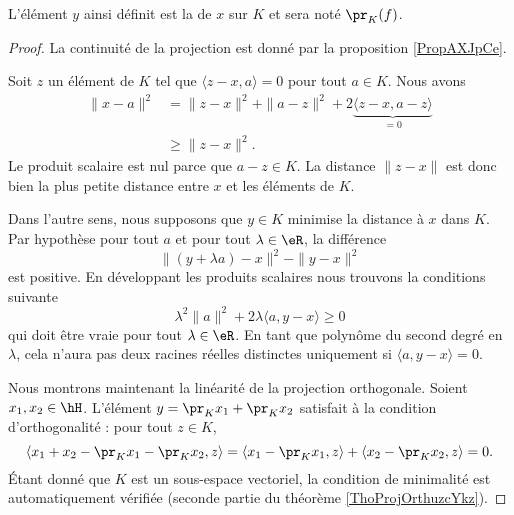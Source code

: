     L'élément \( y\) ainsi définit est la  de \( x\) sur \( K\) et sera noté \( \pr_K(f)\).

\begin{proof}

    La continuité de la projection est donné par la proposition \ref{PropAXJpCe}.

            Soit \( z\) un élément de \( K\) tel que \( \langle z-x, a\rangle =0\) pour tout \( a\in K\). Nous avons
            \begin{subequations}
                \begin{align}
                    \| x-a \|^2&=\| z-x \|^2+\| a-z \|^2+2\underbrace{\langle z-x, a-z\rangle}_{=0}\\
                    &\geq \| z-x \|^2.
                \end{align}
            \end{subequations}
            Le produit scalaire est nul parce que \( a-z\in K\). La distance \( \| z-x \|\) est donc bien la plus petite distance entre \( x\) et les éléments de \( K\).

            Dans l'autre sens, nous supposons que \( y\in K\) minimise la distance à \( x\) dans \( K\). Par hypothèse pour tout \( a\) et pour tout \( \lambda\in \eR\), la différence
            \begin{equation}
                \| (y+\lambda a)-x \|^2-\| y-x \|^2
            \end{equation}
            est positive. En développant les produits scalaires nous trouvons la conditions suivante
            \begin{equation}
                \lambda^2\| a \|^2+2\lambda\langle a, y-x\rangle \geq 0
            \end{equation}
            qui doit être vraie pour tout \( \lambda\in\eR\). En tant que polynôme du second degré en \( \lambda\), cela n'aura pas deux racines réelles distinctes uniquement si \( \langle a, y-x\rangle =0\).
    
            Nous montrons maintenant la linéarité de la projection orthogonale. Soient \( x_1,x_2\in\hH\). L'élément \( y=\pr_Kx_1+\pr_Kx_2\) satisfait à la condition d'orthogonalité : pour tout \( z\in K\),
    \begin{equation}
        \langle x_1+x_2-\pr_Kx_1-\pr_Kx_2, z\rangle =\langle x_1-\pr_Kx_1, z\rangle +\langle x_2-\pr_Kx_2, z\rangle =0.
    \end{equation}
    Étant donné que \( K\) est un sous-espace vectoriel, la condition de minimalité est automatiquement vérifiée (seconde partie du théorème \ref{ThoProjOrthuzcYkz}).


\end{proof}
